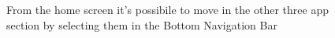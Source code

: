 \begin{figure}[H]
  \label{menu}
   \caption{From the home screen it's possibile to move in the other three app section by selecting them in the Bottom Navigation Bar}
  \centering
   
\end{figure}



